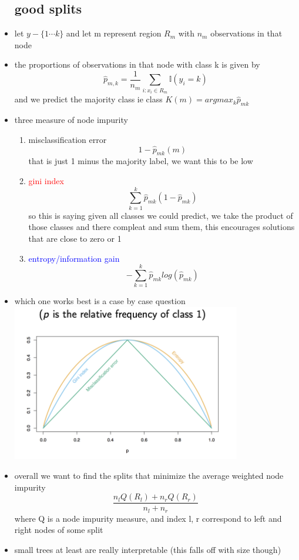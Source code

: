 \documentclass{article}
\begin{document}
\begin{itemize}
\subsection*{good splits}
\item let $y-\{1\cdots k\}$ and let m represent region $R_m$ with $n_m$ observations in that node 
\item the proportions of observations in that node with class k is given by $$\hat{p}_{m,k}=\frac{1}{n_m}\sum_{i:x_i\in R_m}\mathbb{I}(y_i=k)$$ and we predict the majority class ie class $K(m)=argmax_{k}\hat{p}_{mk}$
\item three measure of node impurity 
\begin{enumerate}
    \item misclassification error  $$1-\hat{p}_{mk}(m)$$ that is just 1 minus the majority label, we want this to be low 
    \item \textcolor{red}{gini index} $$\sum_{k=1}^{k}\hat{p}_{mk}(1-\hat{p}_{mk})$$ so this is saying given all classes we could predict, we take the product of those classes and there compleat and sum them, this encourages solutions that are close to zero or 1
    \item \textcolor{blue}{entropy/information gain} $$-\sum_{k=1}^{k}\hat{p}_{mk}log(\hat{p}_{mk})$$
\end{enumerate}
\item which one works best is a case by case question \\ \includegraphics*[width=10cm]{images/Screenshot 2023-05-14 at 7.45.37 PM.png}
\item overall we want to find the splits that minimize the average weighted  node impurity  $$\frac{n_lQ(R_l)+n_rQ(R_r)}{n_l+n_r}$$ where Q is a node impurity measure, and index l, r correspond to left and right nodes of some split 
\item small trees at least are really interpretable (this falls off with size though)

\end{itemize}
\end{document}
